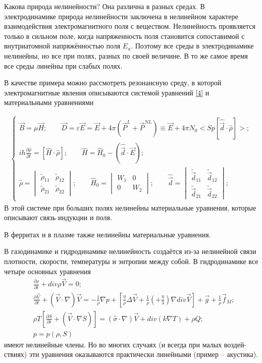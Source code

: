 \documentclass[a4paper]{article}
\begin{document}
Какова природа нелинейности? Она различна в разных средах. В электродинамике природа нелинейности заключена в нелинейном характере взаимодействия электромагнитного поля с веществом. Нелинейность проявляется только в сильном поле, когда напряженность поля становится сопоставимой с внутриатомной напряжённостью поля  $E_{a}$. Поэтому все среды в электродинамике нелинейны, но все при полях, разных по своей величине. В то же самое время все среды линейны при слабых полях.

В качестве примера можно рассмотреть резонансную среду, в которой электромагнитные явления описываются системой уравнений \eqref{4} и материальными уравнениями 

\begin{align}
	\begin{cases}
	\vec{B}=\mu\vec{H};\qquad\vec{D}=\varepsilon\vec{E}=\vec{E}+4\pi(\vec{P}^{L}+\vec{P}^{NL})\equiv\vec{E}+4\pi N_{0}<Sp\left[\hat{\vec{d}}\cdot\hat{\rho}\right]>;\\
	ih\frac{\partial\hat{\rho}}{\partial t}=\left[\hat{H}\cdot\hat{\rho}\right];\qquad\hat{H}=\hat{H}_{0}-\left(\hat{\vec{d}}\cdot\vec{E}\right);\\
	\hat{\rho}=
	\begin{vmatrix}
		\tilde{\rho}_{11}& \tilde{\rho}_{12}\\
		\tilde{\rho}_{21}& \tilde{\rho}_{22}
	\end{vmatrix};\qquad
	\hat{H}_{0}=
	\begin{vmatrix}
		W_{1}& 0\\
		0& W_{2}
	\end{vmatrix};\qquad
	\hat{\vec{d}}=
	\begin{vmatrix}
		\tilde{\vec{d}}_{11}& \tilde{\vec{d}}_{12}\\
		\tilde{\vec{d}}_{21}& \tilde{\vec{d}}_{22}
	\end{vmatrix};
	\end{cases}
	\tag{5''}\label{5''}
\end{align}
В этой системе при больших полях нелинейны материальные уравнения, которые описывают связь индукции и поля.

В ферритах и в плазме также нелинейны материальные уравнения. 

В газодинамике и гидродинамике нелинейность создаётся из-за нелинейной связи плотности, скорости, температуры и энтропии между собой. В гидродинамике все четыре основных уравнения
\begin{eqnarray*}
	& \frac{\partial\rho}{\partial t}+div\rho\vec{V}=0;\\
	& \frac{\partial\vec{V}}{\partial t}+\left(\vec{V}\cdot\nabla\right)\vec{V}=-\frac{1}{\rho}\nabla p+\left[\frac{\eta}{\rho}\Delta\vec{V}+\frac{1}{\rho}\left( +\frac{\eta}{3}\right)\nabla div\vec{V}\right]+\vec{g}+\frac{1}{\rho}\vec{f}_{M};\\
	& \rho T\left[\frac{\partial S}{\partial t}+\left(\vec{V}\cdot\nabla S\right)\right]=\left(\hat{\sigma}\cdot\nabla\right)\vec{V}+div\left(k\nabla T\right)+\rho Q;\\
	& p=p\left(\rho,S\right)
\end{eqnarray*}
имеют нелинейные члены. Но во многих случаях (и всегда при малых воздей-ствиях) эти уравнения оказываются практически линейными (пример – акустика).
\end{document}
